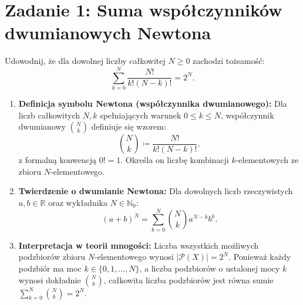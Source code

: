 \section{Zadanie 1: Suma współczynników dwumianowych Newtona}
\label{sec:zadanie1}

\begin{tresczadania}
Udowodnij, że dla dowolnej liczby całkowitej $N \geqslant 0$ zachodzi tożsamość:
\begin{equation*}
    \sum_{k=0}^{N} \frac{N!}{k!(N-k)!} = 2^N.
\end{equation*}
\end{tresczadania}

\vspace{0.2cm}

\begin{teoriabox}
\begin{enumerate}
    \item \textbf{Definicja symbolu Newtona (współczynnika dwumianowego):}
    Dla liczb całkowitych $N, k$ spełniających warunek $0 \leqslant k \leqslant N$, współczynnik dwumianowy $\binom{N}{k}$ definiuje się wzorem:
    \begin{equation}
        \binom{N}{k} \coloneqq \frac{N!}{k!(N-k)!},
        \label{eq:newton_def}
    \end{equation}
    z formalną konwencją $0! = 1$. Określa on liczbę kombinacji $k$-elementowych ze zbioru $N$-elementowego.

    \item \textbf{Twierdzenie o dwumianie Newtona:}
    Dla dowolnych liczb rzeczywistych $a, b \in \mathbb{R}$ oraz wykładnika $N \in \mathbb{N}_0$:
    \begin{equation}
        (a + b)^N = \sum_{k=0}^{N} \binom{N}{k} a^{N-k} b^k.
        \label{eq:binomial_theorem}
    \end{equation}

    \item \textbf{Interpretacja w teorii mnogości:}
    Liczba wszystkich możliwych podzbiorów zbioru $N$-elementowego wynosi $|\mathcal{P}(X)| = 2^N$. Ponieważ każdy podzbiór ma moc $k \in \{0, 1, \dots, N\}$, a liczba podzbiorów o ustalonej mocy $k$ wynosi dokładnie $\binom{N}{k}$, całkowita liczba podzbiorów jest równa sumie $\sum_{k=0}^N \binom{N}{k} = 2^N$.
\end{enumerate}
\end{teoriabox}

\vspace{0.2cm}


